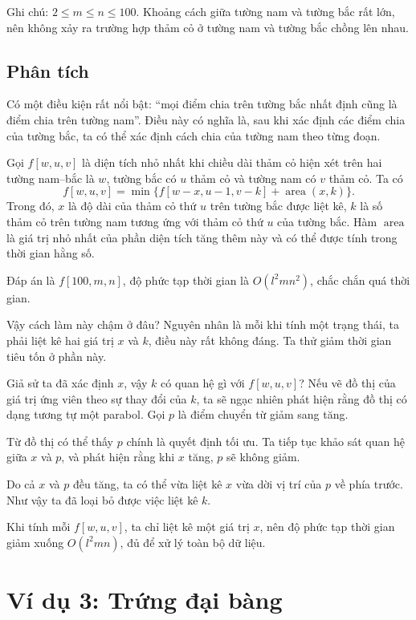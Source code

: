 \documentclass[11pt]{article}
\begin{document}
Ghi chú: $2\le m\le n\le 100$. Khoảng cách giữa tường nam và tường bắc rất
lớn, nên không xảy ra trường hợp thảm cỏ ở tường nam và tường bắc chồng lên
nhau.

\subsection*{Phân tích}

Có một điều kiện rất nổi bật: ``mọi điểm chia trên tường bắc nhất định cũng
là điểm chia trên tường nam''. Điều này có nghĩa là, sau khi xác định các
điểm chia của tường bắc, ta có thể xác định cách chia của tường nam theo từng
đoạn.

Gọi $f[w,u,v]$ là diện tích nhỏ nhất khi chiều dài thảm cỏ hiện xét trên hai
tường nam--bắc là $w$, tường bắc có $u$ thảm cỏ và tường nam có $v$ thảm cỏ.
Ta có
\[
  f[w,u,v]=\min\{f[w-x,u-1,v-k]+\operatorname{area}(x,k)\}.
\]
Trong đó, $x$ là độ dài của thảm cỏ thứ $u$ trên tường bắc được liệt kê, $k$
là số thảm cỏ trên tường nam tương ứng với thảm cỏ thứ $u$ của tường bắc.
Hàm $\operatorname{area}$ là giá trị nhỏ nhất của phần diện tích tăng thêm này
và có thể được tính trong thời gian hằng số.

Đáp án là $f[100,m,n]$, độ phức tạp thời gian là $O(l^2mn^2)$, chắc chắn quá
thời gian.

Vậy cách làm này chậm ở đâu? Nguyên nhân là mỗi khi tính một trạng thái, ta
phải liệt kê hai giá trị $x$ và $k$, điều này rất không đáng. Ta thử giảm thời
gian tiêu tốn ở phần này.

Giả sử ta đã xác định $x$, vậy $k$ có quan hệ gì với $f[w,u,v]$? Nếu vẽ đồ
thị của giá trị ứng viên theo sự thay đổi của $k$, ta sẽ ngạc nhiên phát hiện
rằng đồ thị có dạng tương tự một parabol. Gọi $p$ là điểm chuyển từ giảm sang
tăng.

Từ đồ thị có thể thấy $p$ chính là quyết định tối ưu. Ta tiếp tục khảo sát
quan hệ giữa $x$ và $p$, và phát hiện rằng khi $x$ tăng, $p$ sẽ không giảm.

Do cả $x$ và $p$ đều tăng, ta có thể vừa liệt kê $x$ vừa dời vị trí của $p$ về
phía trước. Như vậy ta đã loại bỏ được việc liệt kê $k$.

Khi tính mỗi $f[w,u,v]$, ta chỉ liệt kê một giá trị $x$, nên độ phức tạp thời
gian giảm xuống $O(l^2mn)$, đủ để xử lý toàn bộ dữ liệu.

\section{Ví dụ 3: Trứng đại bàng}
\end{document}
